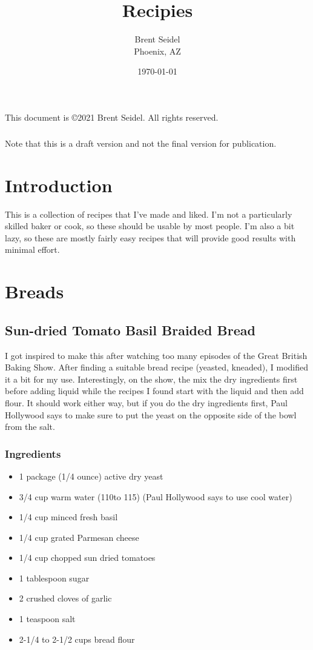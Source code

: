 \documentclass[10pt, openany]{book}
\title{Recipies}
\author{Brent Seidel \\ Phoenix, AZ}
\date{ \today }
\begin{document}
%
%
\frontmatter
\maketitle
\begin{center}
This document is \copyright 2021 Brent Seidel.  All rights reserved.

\paragraph{}Note that this is a draft version and not the final version for publication.
\end{center}
\tableofcontents

\mainmatter
\chapter{Introduction}
This is a collection of recipes that I've made and liked.  I'm not a particularly skilled baker or cook, so these should be usable by most people.  I'm also a bit lazy, so these are mostly fairly easy recipes that will provide good results with minimal effort.

\chapter{Breads}
\section{Sun-dried Tomato Basil Braided Bread}
I got inspired to make this after watching too many episodes of the Great British Baking Show.  After finding a suitable bread recipe (yeasted, kneaded), I modified it a bit for my use.  Interestingly, on the show, the mix the dry ingredients first before adding liquid while the recipes I found start with the liquid and then add flour.  It should work either way, but if you do the dry ingredients first, Paul Hollywood says to make sure to put the yeast on the opposite side of the bowl from the salt.

\subsection{Ingredients}
\begin{itemize}
  \item 1 package (1/4 ounce) active dry yeast
  \item 3/4 cup warm water (110\degree to 115\degree) (Paul Hollywood says to use cool water)
  \item 1/4 cup minced fresh basil
  \item 1/4 cup grated Parmesan cheese
  \item 1/4 cup chopped sun dried tomatoes
  \item 1 tablespoon sugar
  \item 2 crushed cloves of garlic
  \item 1 teaspoon salt
  \item 2-1/4 to 2-1/2 cups bread flour
\end{itemize}
\end{document}
